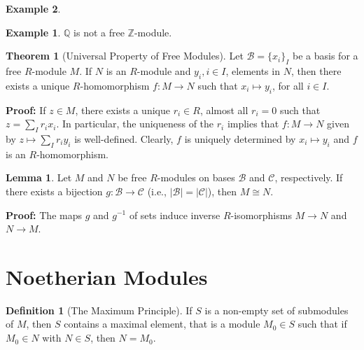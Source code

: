 \documentclass[11pt]{amsbook}%
\theoremstyle{plain}
\theoremstyle{definition}
\newtheorem{definition*}{Definition}
\newtheorem*{example*}{Example}
\newtheorem{lemma}{Lemma}
\newtheorem{theorem}{Theorem}
\numberwithin{equation}{section}
\newcommand{\QQ}{\mathbb Q}
\newcommand{\ZZ}{\mathbb Z}
\newcommand{\CK}{\mathcal C}
\newcommand{\BC}{\mathcal B}
\renewcommand{\proof}{ \textbf{Proof: }}
\renewcommand{\ie}{i.e., }
\begin{document}
\begin{example*}
\begin{example*}
  $\QQ$ is not a free $\ZZ$-module.
\end{example*}

\begin{theorem}[Universal Property of Free Modules]
  Let $\BC = \{x_{i}\}_{I}$ be a basis for a free $R$-module $M$. If $N$ is
  an $R$-module and $y_{i}, i \in I$, elements in $N$, then there exists
  a unique $R$-homomorphism $f: M \longrightarrow N$ such that
  $x_{i} \mapsto y_{i}$, for all $i \in I$.
\end{theorem} \vspace{1.8em}
\proof If $z \in M$, there exists a unique $r_{i} \in R$, almost all $r_{i} = 0$
such that $z = \sum_{I} r_{i}x_{i}$. In particular, the uniqueness of the $r_{i}$
implies that $f: M \longrightarrow N$ given by $z \mapsto \sum_{I} r_{i}y_{i}$ is well-defined.
Clearly, $f$ is uniquely determined by $x_{i} \mapsto y_{i}$ and $f$ is an $R$-homomorphism. \qedsymbol

\begin{lemma}
  Let $M$ and $N$ be free $R$-modules on bases $\BC$ and $\CK$, respectively.
  If there exists a bijection $g: \BC \longrightarrow \CK$ (\ie $|\BC| = |\CK|$),
  then $M \cong N$.
\end{lemma} \vspace{1.8em}
\proof The maps $g$ and $g^{-1}$ of sets induce inverse $R$-isomorphisms $M \longrightarrow N$
and $N \longrightarrow M$. \qedsymbol

\section{Noetherian Modules}

\begin{definition*}[The Maximum Principle]
  \label{def-maximum-principle}
  If $S$ is a non-empty set of submodules of $M$, then $S$ contains a maximal element,
  that is a module $M_{0} \in S$ such that if $M_{0} \in N$ with $N \in S$, then
  $N = M_{0}$.
\end{definition*}


\end{example*}
\end{document}
